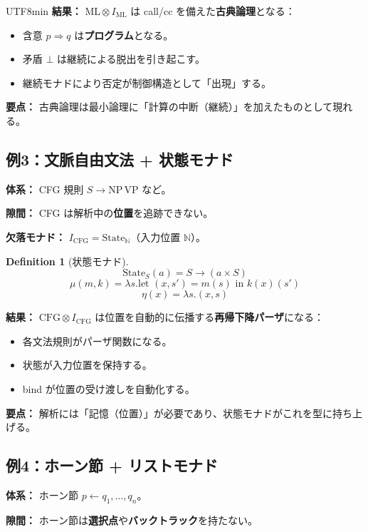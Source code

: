\documentclass[a4paper,11pt]{article}
\renewcommand{\emph}[1]{\textbf{#1}}
\theoremstyle{definition}
\newtheorem{definition}{Definition}[section]
\begin{document}
\begin{CJK}{UTF8}{min}
\textbf{結果：} $\text{ML} \otimes I_{\text{ML}}$ は call/cc を備えた\emph{古典論理}となる：
\begin{itemize}
  \item 含意 $p \Rightarrow q$ は\emph{プログラム}となる。
  \item 矛盾 $\bot$ は継続による脱出を引き起こす。
  \item 継続モナドにより否定が制御構造として「出現」する。
\end{itemize}

\textbf{要点：} 古典論理は最小論理に「計算の中断（継続）」を加えたものとして現れる。

\subsection{例3：文脈自由文法 + 状態モナド}

\textbf{体系：} CFG 規則 $S \to \text{NP} \, \text{VP}$ など。

\textbf{隙間：} CFG は解析中の\emph{位置}を追跡できない。

\textbf{欠落モナド：} $I_{\text{CFG}} = \text{State}_{\mathbb{N}}$（入力位置 $\mathbb{N}$）。

\begin{definition}[状態モナド]
\[\text{State}_S(a) = S \to (a \times S)\]
\[\mu(m, k) = \lambda s. \text{let } (x, s') = m(s) \text{ in } k(x)(s')\]
\[\eta(x) = \lambda s. (x, s)\]
\end{definition}

\textbf{結果：} $\text{CFG} \otimes I_{\text{CFG}}$ は位置を自動的に伝播する\emph{再帰下降パーザ}になる：
\begin{itemize}
  \item 各文法規則がパーザ関数になる。
  \item 状態が入力位置を保持する。
  \item bind が位置の受け渡しを自動化する。
\end{itemize}

\textbf{要点：} 解析には「記憶（位置）」が必要であり、状態モナドがこれを型に持ち上げる。

\subsection{例4：ホーン節 + リストモナド}

\textbf{体系：} ホーン節 $p \leftarrow q_1, \ldots, q_n$。

\textbf{隙間：} ホーン節は\emph{選択点}や\emph{バックトラック}を持たない。


\end{CJK}
\end{document}
